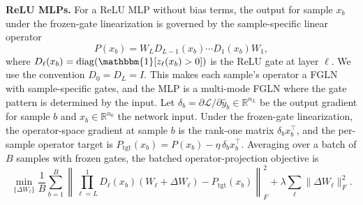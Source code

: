 \documentclass{article}
\newcommand{\R}{\mathbb{R}}
\newcommand{\normF}[1]{\|#1\|_F}
\newcommand{\Ptgt}{P_{\mathrm{tgt}}}
\begin{document}
\textbf{ReLU MLPs.}
For a ReLU MLP without bias terms, the output for sample $x_b$ under the frozen-gate linearization is governed by the sample-specific linear operator
\begin{equation}
  P(x_b) = W_L D_{L-1}(x_b) \cdots D_1(x_b) W_1,
  \label{eq:mlp-operator}
\end{equation}
where $D_\ell(x_b) = \mathrm{diag}(\mathbbm{1}[z_\ell(x_b) > 0])$ is the
ReLU gate at layer $\ell$. We use the convention $D_0 = D_L = I$.
This makes each sample's operator a FGLN with sample-specific gates,
and the MLP is a multi-mode FGLN where the gate pattern is determined by the
input.
%
Let $\delta_b = \partial \mathcal{L} / \partial \hat y_b \in \R^{n_L}$ be the
output gradient for sample $b$ and $x_b \in \R^{n_0}$ the network input.
Under the frozen-gate linearization, the operator-space gradient at sample $b$
is the rank-one matrix $\delta_b x_b^\top$, and the per-sample operator target
is
  $\Ptgt(x_b) = P(x_b) - \eta\, \delta_b x_b^\top$.
Averaging over a batch of $B$ samples with frozen gates, the batched
operator-projection objective is
\begin{equation}
  \min_{\{\Delta W_\ell\}}
  \frac{1}{B} \sum_{b=1}^B
  \left\| \prod_{\ell=L}^1 D_\ell(x_b) (W_\ell + \Delta W_\ell) - \Ptgt(x_b) \right\|_F^2
  + \lambda \sum_\ell \normF{\Delta W_\ell}^2.
  \label{eq:mlp-objective}
\end{equation}
\end{document}
